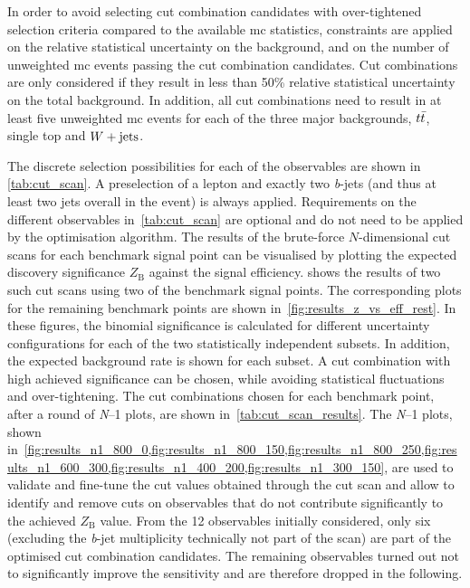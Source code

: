 In order to avoid selecting cut combination candidates with over-tightened selection criteria compared to the available \gls{mc} statistics, constraints are applied on the relative statistical uncertainty on the background, and on the number of unweighted \gls{mc} events passing the cut combination candidates.
Cut combinations are only considered if they result in less than 50\% relative statistical uncertainty on the total background.
In addition, all cut combinations need to result in at least five unweighted \gls{mc} events for each of the three major backgrounds, $t\bar{t}$, single top and $W+\mathrm{jets}$.

The discrete selection possibilities for each of the observables are shown in \cref{tab:cut_scan}.
A preselection of a lepton and exactly two \textit{b}-jets (and thus at least two jets overall in the event) is always applied. Requirements on the different observables in~\cref{tab:cut_scan} are optional and do not need to be applied by the optimisation algorithm.
The results of the brute-force $N$-dimensional cut scans for each benchmark signal point can be visualised by plotting the expected discovery significance $Z_\mathrm{B}$ against the signal efficiency.
 shows the results of two such cut scans using two of the benchmark signal points.
The corresponding plots for the remaining benchmark points are shown in~\cref{fig:results_z_vs_eff_rest}. In these figures, the binomial significance is calculated for different uncertainty configurations for each of the two statistically independent subsets.
In addition, the expected background rate is shown for each subset.
A cut combination with high achieved significance can be chosen, while avoiding statistical fluctuations and over-tightening.
The cut combinations chosen for each benchmark point, after a round of \textit{N}--1 plots, are shown in~\cref{tab:cut_scan_results}. The \textit{N}--1 plots, shown in~\cref{fig:results_n1_800_0,fig:results_n1_800_150,fig:results_n1_800_250,fig:results_n1_600_300,fig:results_n1_400_200,fig:results_n1_300_150}, are used to validate and fine-tune the cut values obtained through the cut scan and allow to identify and remove cuts on observables that do not contribute significantly to the achieved $Z_\mathrm{B}$ value.
From the 12 observables initially considered, only six (excluding the \textit{b}-jet multiplicity technically not part of the scan) are part of the optimised cut combination candidates.
The remaining observables turned out not to significantly improve the sensitivity and are therefore dropped in the following.


